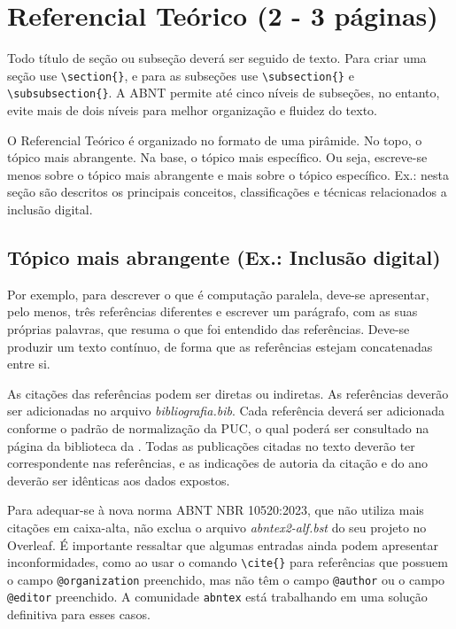 \section{\esp Referencial Teórico (2 - 3 páginas)}

Todo título de seção ou subseção deverá ser seguido de texto.  Para criar uma seção use \verb|\section{}|, e para as subseções use \verb|\subsection{}| e \verb|\subsubsection{}|. A ABNT permite até cinco níveis de subseções, no entanto, evite mais de dois níveis para melhor organização e fluidez do texto.


O Referencial Teórico é organizado no formato de uma pirâmide. No topo, o tópico mais abrangente. Na base, o tópico mais específico. Ou seja, escreve-se menos sobre o tópico mais abrangente e mais sobre o tópico específico. Ex.: nesta seção são descritos os principais conceitos, classificações e técnicas relacionados a inclusão digital. 

\subsection{\esp Tópico mais abrangente (Ex.: Inclusão digital)} 
\label{subsec:1}
Por exemplo, para descrever o que é computação paralela, deve-se apresentar, pelo menos, três referências diferentes e escrever um parágrafo, com as suas próprias palavras, que resuma o que foi entendido das referências. Deve-se produzir um texto contínuo, de forma que as referências estejam concatenadas entre si.

As citações das referências podem ser diretas ou indiretas. As referências deverão ser adicionadas no arquivo \textit{bibliografia.bib}. Cada referência deverá ser adicionada conforme o padrão de normalização da PUC, 
o qual poderá ser consultado na página da biblioteca da . Todas as publicações citadas no texto deverão ter correspondente nas referências, 
e as indicações de autoria da citação e do ano deverão ser idênticas aos dados expostos. 

Para adequar-se à nova norma ABNT NBR 10520:2023, que não utiliza mais citações em caixa-alta, não exclua o arquivo \textit{abntex2-alf.bst} do seu projeto no Overleaf. É importante ressaltar que algumas entradas ainda podem apresentar inconformidades, como ao usar o comando \verb|\cite{}| para referências que possuem o campo \verb|@organization| preenchido, mas não têm o campo \verb|@author| ou o campo \verb|@editor| preenchido. A comunidade \texttt{abntex} está trabalhando em uma solução definitiva para esses casos. 

